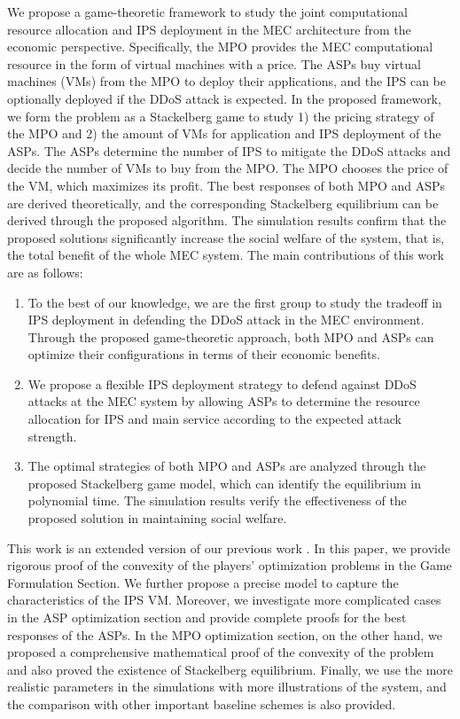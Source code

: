 \documentclass[10pt,journal, compsoc]{IEEEtran}
\begin{document}
We propose a game-theoretic framework to study the joint computational resource allocation and IPS deployment in the MEC architecture from the economic perspective. Specifically, the MPO provides the MEC computational resource in the form of virtual machines with a price. The ASPs buy virtual machines (VMs) from the MPO to deploy their applications, and the IPS can be optionally deployed if the DDoS attack is expected. In the proposed framework, we form the problem as a Stackelberg game to study 1) the pricing strategy of the MPO and 2) the amount of VMs for application and IPS deployment of the ASPs. The ASPs determine the number of IPS to mitigate the DDoS attacks and decide the number of VMs to buy from the MPO. The MPO chooses the price of the VM, which maximizes its profit. The best responses of both MPO and ASPs are derived theoretically, and the corresponding Stackelberg equilibrium can be derived through the proposed algorithm. The simulation results confirm that the proposed solutions significantly increase the social welfare of the system, that is, the total benefit of the whole MEC system.
The main contributions of this work are as follows:
\begin{enumerate}
    \item To the best of our knowledge, we are the first group to study the tradeoff in IPS deployment in defending the DDoS attack in the MEC environment. Through the proposed game-theoretic approach, both MPO and ASPs can optimize their configurations in terms of their economic benefits.
    \item We propose a flexible IPS deployment strategy to defend against DDoS attacks at the MEC system by allowing ASPs to determine the resource allocation for IPS and main service according to the expected attack strength. 
    \item The optimal strategies of both MPO and ASPs are analyzed through the proposed Stackelberg game model, which can identify the equilibrium in polynomial time. The simulation results verify the effectiveness of the proposed solution in maintaining social welfare. 
\end{enumerate}

This work is an extended version of our previous work \cite{Chang2}. In this paper, we provide rigorous proof of the convexity of the players' optimization problems in the Game Formulation Section. We further propose a precise model to capture the characteristics of the IPS VM. Moreover, we investigate more complicated cases in the ASP optimization section and provide complete proofs for the best responses of the ASPs. In the MPO optimization section, on the other hand, we proposed a comprehensive mathematical proof of the convexity of the problem and also proved the existence of Stackelberg equilibrium. Finally, we use the more realistic parameters in the simulations with more illustrations of the system, and the comparison with other important baseline schemes is also provided.
\end{document}
